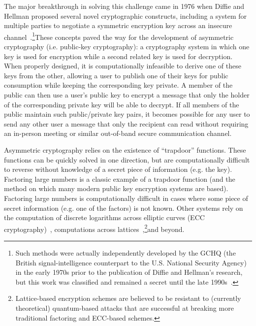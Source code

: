 The major breakthrough in solving this challenge came in 1976 when
Diffie and Hellman proposed several novel cryptographic constructs,
including a system for multiple parties to negotiate a symmetric
encryption key across an insecure
channel~\cite{diffie1976}.\footnote{Such methods were actually
  independently developed by the GCHQ (the British signal-intelligence
  counterpart to the U.S. National Security Agency) in the early 1970s
  prior to the publication of Diffie and Hellman's research, but this
  work was classified and remained a secret until the late
  1990s~\cite{singh1999}.}These concepts paved the way for the
development of asymmetric cryptography (i.e. public-key cryptography):
a cryptography system in which one key is used for encryption while a
second related key is used for decryption. When properly designed, it
is computationally infeasible to derive one of these keys from the
other, allowing a user to publish one of their keys for public
consumption while keeping the corresponding key private. A member of
the public can then use a user's public key to encrypt a message that
only the holder of the corresponding private key will be able to
decrypt. If all members of the public maintain such public/private key
pairs, it becomes possible for any user to send any other user a
message that only the recipient can read without requiring an
in-person meeting or similar out-of-band secure communication channel.

Asymmetric cryptography relies on the existence of ``trapdoor''
functions. These functions can be quickly solved in one direction, but
are computationally difficult to reverse without knowledge of a secret
piece of information (e.g. the key). Factoring large numbers is a
classic example of a trapdoor function (and the method on which many
modern public key encryption systems are based). Factoring large
numbers is computationally difficult in cases where some piece of
secret information (e.g. one of the factors) is not known. Other
systems rely on the computation of discrete logarithms across elliptic
curves (ECC cryptography)~\cite{koblitz1987, miller1986}, computations
across lattices~\cite{ajtai1996},\footnote{Lattice-based encryption
  schemes are believed to be resistant to (currently theoretical)
  quantum-based attacks that are successful at breaking more
  traditional factoring and ECC-based schemes.}and beyond.

